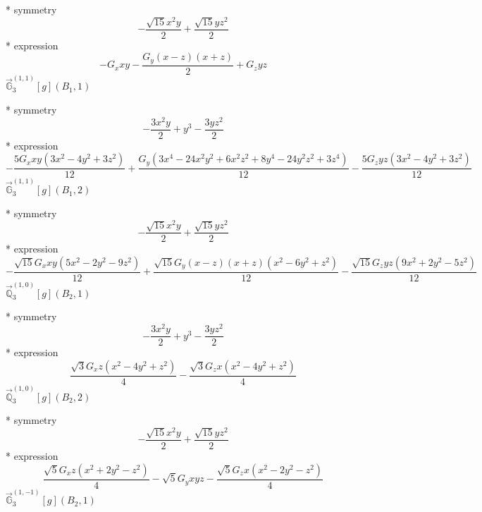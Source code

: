 \documentclass[fleqn,8pt]{jsarticle}
\begin{document}
\noindent\quad ** symmetry
\begin{dmath*}
- \frac{\sqrt{15} x^{2} y}{2} + \frac{\sqrt{15} y z^{2}}{2}
\end{dmath*}
\noindent\quad ** expression
\begin{dmath*}
- G_{x} x y - \frac{G_{y} \left(x - z\right) \left(x + z\right)}{2} + G_{z} y z
\end{dmath*}
\noindent\quad $\vec{\mathbb{G}}_{3}^{(1,1)}[g](B_{1},1)$

\noindent\quad ** symmetry
\begin{dmath*}
- \frac{3 x^{2} y}{2} + y^{3} - \frac{3 y z^{2}}{2}
\end{dmath*}
\noindent\quad ** expression
\begin{dmath*}
- \frac{5 G_{x} x y \left(3 x^{2} - 4 y^{2} + 3 z^{2}\right)}{12} + \frac{G_{y} \left(3 x^{4} - 24 x^{2} y^{2} + 6 x^{2} z^{2} + 8 y^{4} - 24 y^{2} z^{2} + 3 z^{4}\right)}{12} - \frac{5 G_{z} y z \left(3 x^{2} - 4 y^{2} + 3 z^{2}\right)}{12}
\end{dmath*}
\noindent\quad $\vec{\mathbb{G}}_{3}^{(1,1)}[g](B_{1},2)$

\noindent\quad ** symmetry
\begin{dmath*}
- \frac{\sqrt{15} x^{2} y}{2} + \frac{\sqrt{15} y z^{2}}{2}
\end{dmath*}
\noindent\quad ** expression
\begin{dmath*}
- \frac{\sqrt{15} G_{x} x y \left(5 x^{2} - 2 y^{2} - 9 z^{2}\right)}{12} + \frac{\sqrt{15} G_{y} \left(x - z\right) \left(x + z\right) \left(x^{2} - 6 y^{2} + z^{2}\right)}{12} - \frac{\sqrt{15} G_{z} y z \left(9 x^{2} + 2 y^{2} - 5 z^{2}\right)}{12}
\end{dmath*}
\noindent\quad $\vec{\mathbb{Q}}_{3}^{(1,0)}[g](B_{2},1)$

\noindent\quad ** symmetry
\begin{dmath*}
- \frac{3 x^{2} y}{2} + y^{3} - \frac{3 y z^{2}}{2}
\end{dmath*}
\noindent\quad ** expression
\begin{dmath*}
\frac{\sqrt{3} G_{x} z \left(x^{2} - 4 y^{2} + z^{2}\right)}{4} - \frac{\sqrt{3} G_{z} x \left(x^{2} - 4 y^{2} + z^{2}\right)}{4}
\end{dmath*}
\noindent\quad $\vec{\mathbb{Q}}_{3}^{(1,0)}[g](B_{2},2)$

\noindent\quad ** symmetry
\begin{dmath*}
- \frac{\sqrt{15} x^{2} y}{2} + \frac{\sqrt{15} y z^{2}}{2}
\end{dmath*}
\noindent\quad ** expression
\begin{dmath*}
\frac{\sqrt{5} G_{x} z \left(x^{2} + 2 y^{2} - z^{2}\right)}{4} - \sqrt{5} G_{y} x y z - \frac{\sqrt{5} G_{z} x \left(x^{2} - 2 y^{2} - z^{2}\right)}{4}
\end{dmath*}
\noindent\quad $\vec{\mathbb{G}}_{3}^{(1,-1)}[g](B_{2},1)$
\end{document}
